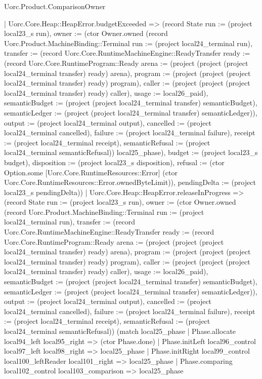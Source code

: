 \begin{lexlean}{Uorc.Product.ComparisonOwner}
\begin{semanticmodule}
{    | Uorc.Core.Heap::HeapError.budgetExceeded => (record State {run := (project local23_s run), owner := (ctor Owner.owned (record Uorc.Product.MachineBinding::Terminal {run := (project local24_terminal run), transfer := (record Uorc.Core.RuntimeMachineEngine::ReadyTransfer {ready := (record Uorc.Core.RuntimeProgram::Ready {arena := (project (project (project local24_terminal transfer) ready) arena), program := (project (project (project local24_terminal transfer) ready) program), caller := (project (project (project local24_terminal transfer) ready) caller), usage := local26_paid}), semanticBudget := (project (project local24_terminal transfer) semanticBudget), semanticLedger := (project (project local24_terminal transfer) semanticLedger)}), output := (project local24_terminal output), cancelled := (project local24_terminal cancelled), failure := (project local24_terminal failure), receipt := (project local24_terminal receipt), semanticRefusal := (project local24_terminal semanticRefusal)}) local25_phase), budget := (project local23_s budget), disposition := (project local23_s disposition), refusal := (ctor Option.some [Uorc.Core.RuntimeResources::Error] (ctor Uorc.Core.RuntimeResources::Error.ownedByteLimit)), pendingDelta := (project local23_s pendingDelta)})
    | Uorc.Core.Heap::HeapError.releaseInProgress => (record State {run := (project local23_s run), owner := (ctor Owner.owned (record Uorc.Product.MachineBinding::Terminal {run := (project local24_terminal run), transfer := (record Uorc.Core.RuntimeMachineEngine::ReadyTransfer {ready := (record Uorc.Core.RuntimeProgram::Ready {arena := (project (project (project local24_terminal transfer) ready) arena), program := (project (project (project local24_terminal transfer) ready) program), caller := (project (project (project local24_terminal transfer) ready) caller), usage := local26_paid}), semanticBudget := (project (project local24_terminal transfer) semanticBudget), semanticLedger := (project (project local24_terminal transfer) semanticLedger)}), output := (project local24_terminal output), cancelled := (project local24_terminal cancelled), failure := (project local24_terminal failure), receipt := (project local24_terminal receipt), semanticRefusal := (project local24_terminal semanticRefusal)}) (match local25_phase
      | Phase.allocate local94_left local95_right => (ctor Phase.done)
      | Phase.initLeft local96_control local97_left local98_right => local25_phase
      | Phase.initRight local99_control local100_leftReader local101_right => local25_phase
      | Phase.comparing local102_control local103_comparison => local25_phase
}}
\end{semanticmodule}
\end{lexlean}
